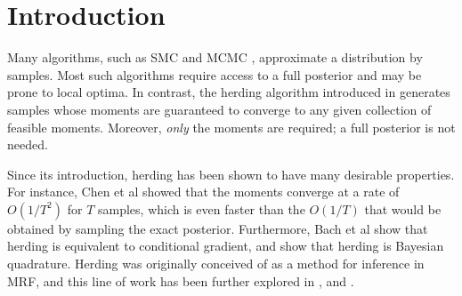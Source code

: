 \documentclass[paper.tex]{subfiles}
\begin{document}
\section{Introduction} 
\label{sec:intro}

Many algorithms, such as SMC \cite{smc} and MCMC \cite{mcmc}, approximate a 
distribution by samples. Most such algorithms require access to a full posterior and 
may be prone to local optima. In contrast, the herding algorithm introduced in 
\cite{Welling:2009a} generates samples whose moments are guaranteed to converge 
to any given collection of feasible moments. Moreover, \emph{only} the moments 
are required; a full posterior is not needed.

Since its introduction, herding has been shown to have many desirable properties.
For instance, Chen et al showed that the moments converge at a rate of $O(1/T^{2})$ for 
$T$ samples, which is even faster than the $O(1/T)$ that would be obtained 
by sampling the exact posterior. Furthermore, Bach et al show that herding is 
equivalent to conditional gradient, and \citet{Huszar:2012} show that 
herding is Bayesian quadrature. Herding was originally conceived of as a method 
for inference in MRF, and this line of work has been further explored in 
\citet{Welling:2009a}, \citet{Gelfand:2010} and \citet{Bornn:2013}.
\end{document}
